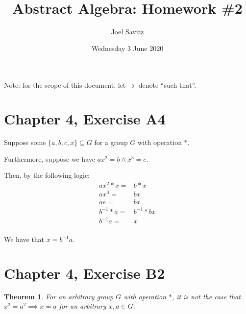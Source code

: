 \documentclass[12pt]{article}
\title{Abstract Algebra: Homework \#2}
\date{Wednesday 3 June 2020}
\author{Joel Savitz}
\newtheorem{thm}{Theorem}
\begin{document}
\maketitle

Note: for the scope of this document, let $\ni$ denote ``such that''.

\section{Chapter 4, Exercise A4}

Suppose some $\{ a, b, c, x \} \subseteq G$ for a group $G$ with operation $*$.

Furthermore, suppose we have $ax^2 = b \land x^3 = e$.

Then, by the following logic:
\begin{align}
	ax^2 * x = &  b * x \\
	ax^3 = &  bx \\
	ae = &  bx \\
	b^{-1} * a = &  b^{-1} * bx \\
	b^{-1} a = & x \\
\end{align}


We have that $x = b^{-1} a$.


\section{Chapter 4, Exercise B2}

\begin{thm} \label{thm:1}
	For an arbitrary group $G$ with operation $*$, it is not the case that $x^2 = a^2 \implies x = a$ for an arbitrary $x,a \in G$.
\end{thm}
\end{document}
